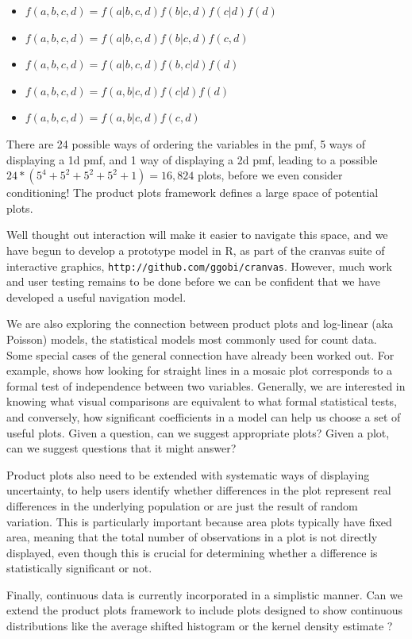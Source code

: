 \documentclass[journal]{vgtc}
\begin{document}
\begin{itemize}
  \setlength{\itemsep}{0em}
  
  \item $f(a, b, c, d) = f(a | b, c, d) f(b | c, d) f(c | d) f(d)$
  \item $f(a, b, c, d) = f(a | b, c, d) f(b | c, d) f(c, d)$
  \item $f(a, b, c, d) = f(a | b, c, d) f(b, c | d) f(d)$
  \item $f(a, b, c, d) = f(a, b | c, d) f(c | d) f(d)$
  \item $f(a, b, c, d) = f(a, b | c, d) f(c, d)$
\end{itemize}

\noindent There are 24 possible ways of ordering the variables in the {\sc pmf}, 5 ways of displaying a 1d {\sc pmf}, and 1 way of displaying a 2d {\sc pmf}, leading to a possible $24 * (5^4 + 5^2 + 5^2 + 5^2 + 1) = 16,824$ plots, before we even consider conditioning! The product plots framework defines a large space of potential plots.

Well thought out interaction will make it easier to navigate this space, and we have begun to develop a prototype model in R, as part of the cranvas suite of interactive graphics, {\tt http://github.com/ggobi/cranvas}.  However, much work and user testing remains to be done before we can be confident that we have developed a useful navigation model.

We are also exploring the connection between product plots and log-linear (aka Poisson) models, the statistical models most commonly used for count data. Some special cases of the general connection have already been worked out. For example, \citep{hofmann:2003} shows how looking for straight lines in a mosaic plot corresponds to a formal test of independence between two variables. Generally, we are interested in knowing what visual comparisons are equivalent to what formal statistical tests, and conversely, how significant coefficients in a model can help us choose a set of useful plots. Given a question, can we suggest appropriate plots? Given a plot, can we suggest questions that it might answer?

Product plots also need to be extended with systematic ways of displaying uncertainty, to help users identify whether differences in the plot represent real differences in the underlying population or are just the result of random variation. This is particularly important because area plots typically have fixed area, meaning that the total number of observations in a plot is not directly displayed, even though this is crucial for determining whether a difference is statistically significant or not.

Finally, continuous data is currently incorporated in a simplistic manner. Can we extend the product plots framework to include plots designed to show continuous distributions like the average shifted histogram \citep{scott:1985} or the kernel density estimate \citep{scott:1992}?




\end{document}
